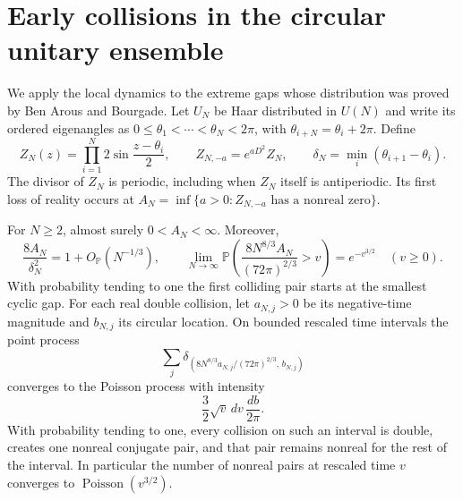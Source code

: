\section{Early collisions in the circular unitary ensemble}
\label{sec:cue-collisions}

We apply the local dynamics to the extreme gaps whose distribution was proved by Ben Arous and Bourgade. Let $U_N$ be Haar distributed in $U(N)$ and write its ordered eigenangles as
$0\le\theta_1<\cdots<\theta_N<2\pi$, with
$\theta_{i+N}=\theta_i+2\pi$. Define
\[
 Z_N(z)=\prod_{i=1}^N2\sin\frac{z-\theta_i}{2},\qquad
 Z_{N,-a}=e^{aD^2}Z_N,\qquad
 \delta_N=\min_i(\theta_{i+1}-\theta_i).
\]
The divisor of $Z_N$ is periodic, including when $Z_N$ itself is antiperiodic. Its first loss of reality occurs at
$A_N=\inf\{a>0:Z_{N,-a}\text{ has a nonreal zero}\}$.

\begin{theorem}\label{thm:cue-collisions}
For $N\ge2$, almost surely $0<A_N<\infty$. Moreover,
\[
 \frac{8A_N}{\delta_N^2}=1+O_{\mathbb P}(N^{-1/3}),\qquad
 \lim_{N\to\infty}\mathbb P\left(
   \frac{8N^{8/3}A_N}{(72\pi)^{2/3}}>v\right)=e^{-v^{3/2}}
 \quad(v\ge0).
\]
With probability tending to one the first colliding pair starts at the smallest cyclic gap.
For each real double collision, let $a_{N,j}>0$ be its negative-time magnitude and $b_{N,j}$ its circular location. On bounded rescaled time intervals the point process
\[
 \sum_j\delta_{(8N^{8/3}a_{N,j}/(72\pi)^{2/3},\,b_{N,j})}
\]
converges to the Poisson process with intensity
\[
                  \frac32\sqrt v\,dv\,\frac{db}{2\pi}.
\]
With probability tending to one, every collision on such an interval is double, creates one nonreal conjugate pair, and that pair remains nonreal for the rest of the interval. In particular the number of nonreal pairs at rescaled time $v$ converges to $\operatorname{Poisson}(v^{3/2})$.
\end{theorem}

